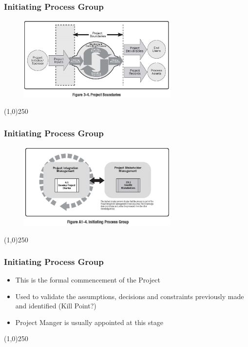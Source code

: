 \begin{frame}
\frametitle{Initiating Process Group}
 \begin{figure}
 	\centering
 		\includegraphics[width = 8cm]{images/Fig3-4.jpg}
 	\label{fig:3-4}
 \end{figure}
\end{frame}
\begin{center}\line(1,0){250}\end{center}



\begin{frame}
\frametitle{Initiating Process Group}
 \begin{figure}
 	\centering
 		\includegraphics[width = 8cm]{images/FigA1-4.jpg}
 	\label{fig:1-4}
 \end{figure}
\end{frame}
\begin{center}\line(1,0){250}\end{center}



\begin{frame}
\frametitle{Initiating Process Group}
\begin{itemize}
	\item This is the formal commencement of the Project
	\item Used to validate the assumptions, decisions and constraints previously made and identified (Kill Point?)
	\item Project Manger is usually appointed at this stage
\end{itemize}
\end{frame}
\begin{center}\line(1,0){250}\end{center}



